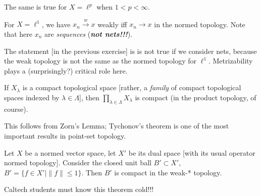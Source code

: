 \begin{remark}
The same is true for $X=\ell^{p}$ when $1<p<\infty$.
\end{remark}

\begin{xca}
For $X=\ell^{1}$, we have $x_{n}\xrightarrow{w}x$ weakly iff $x_{n}\to x$
in the normed topology. Note that here $x_{n}$ are \emph{sequences}
(\textbf{\emph{not nets!!!}}).
\end{xca}

\begin{node}
The statement [in the previous exercise] is is not true if we consider
nets, because the weak topology is not the same as the normed topology for
$\ell^{1}$. Metrizability plays a (surprisingly?) critical role here.
\end{node}

\begin{recall}
If $X_{\lambda}$ is a compact topological space [rather, a
  \emph{family} of compact topological spaces indexed by $\lambda\in\Lambda$],
then $\prod_{\lambda\in\Lambda}X_{\lambda}$ is compact (in the product
topology, of course).
\end{recall}

\begin{node}
This follows from Zorn's Lemma; Tychonov's theorem is one of the most
important results in point-set topology.
\end{node}

\begin{theorem}
Let $X$ be a normed vector space, let $X'$ be its dual space [with its
  usual operator normed topology]. Consider the closed unit ball
$B'\subset X'$, $B'=\{f\in X'\mid \|f\|\leq1\}$. Then $B'$ is compact
in the weak-* topology.
\end{theorem}

\begin{remark}
Caltech students must know this theorem cold!!!
\end{remark}

